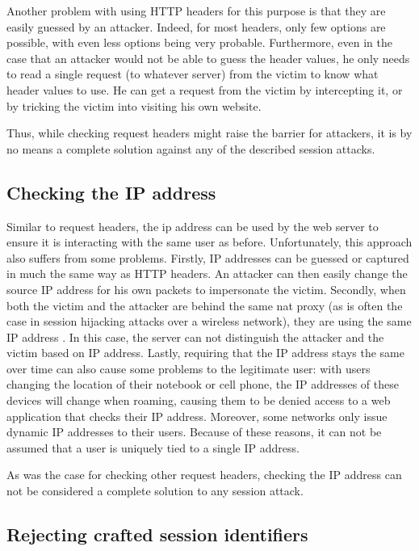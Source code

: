 Another problem with using HTTP headers for this purpose is that they are easily guessed by an attacker. Indeed, for most headers, only few options are possible, with even less options being very probable. Furthermore, even in the case that an attacker would not be able to guess the header values, he only needs to read a single request (to whatever server) from the victim to know what header values to use. He can get a request from the victim by intercepting it, or by tricking the victim into visiting his own website.

Thus, while checking request headers might raise the barrier for attackers, it is by no means a complete solution against any of the described session attacks.

\subsection{Checking the IP address}

Similar to request headers, the \gls{ip} address can be used by the web server to ensure it is interacting with the same user as before. Unfortunately, this approach also suffers from some problems. Firstly, IP addresses can be guessed or captured in much the same way as HTTP headers. An attacker can then easily change the source IP address for his own packets to impersonate the victim. Secondly, when both the victim and the attacker are behind the same \gls{nat} proxy (as is often the case in session hijacking attacks over a wireless network), they are using the same IP address \cite{Johns2011}. In this case, the server can not distinguish the attacker and the victim based on IP address. Lastly, requiring that the IP address stays the same over time can also cause some problems to the legitimate user: with users changing the location of their notebook or cell phone, the IP addresses of these devices will change when roaming, causing them to be denied access to a web application that checks their IP address. Moreover, some networks only issue dynamic IP addresses to their users. Because of these reasons, it can not be assumed that a user is uniquely tied to a single IP address.

As was the case for checking other request headers, checking the IP address can not be considered a complete solution to any session attack.

\subsection{Rejecting crafted session identifiers}

